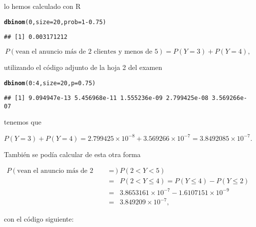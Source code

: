 \documentclass[12pt]{article}\usepackage[]{graphicx}\usepackage[]{color}
\makeatletter
\newcommand{\hlnum}[1]{\textcolor[rgb]{0.686,0.059,0.569}{#1}}%
\newcommand{\hlopt}[1]{\textcolor[rgb]{0,0,0}{#1}}%
\newcommand{\hlstd}[1]{\textcolor[rgb]{0.345,0.345,0.345}{#1}}%
\newcommand{\hlkwc}[1]{\textcolor[rgb]{0.333,0.667,0.333}{#1}}%
\newcommand{\hlkwd}[1]{\textcolor[rgb]{0.737,0.353,0.396}{\textbf{#1}}}%
\newenvironment{kframe}{%
 \def\at@end@of@kframe{}%
 \ifinner\ifhmode%
  \def\at@end@of@kframe{\end{minipage}}%
  \begin{minipage}{\columnwidth}%
 \fi\fi%
 \def\FrameCommand##1{\hskip\@totalleftmargin \hskip-\fboxsep
 \colorbox{shadecolor}{##1}\hskip-\fboxsep
     \hskip-\linewidth \hskip-\@totalleftmargin \hskip\columnwidth}%
 \MakeFramed {\advance\hsize-\width
   \@totalleftmargin\z@ \linewidth\hsize
   \@setminipage}}%
 {\par\unskip\endMakeFramed%
 \at@end@of@kframe}
\newenvironment{knitrout}{}{} %
\renewcommand{\leq}{\leqslant}
\makeatother
\begin{document}
lo hemos calculado con R

\begin{knitrout}
\color{fgcolor}\begin{kframe}
\begin{alltt}
\hlkwd{dbinom}\hlstd{(}\hlnum{0}\hlstd{,}\hlkwc{size}\hlstd{=}\hlnum{20}\hlstd{,}\hlkwc{prob}\hlstd{=}\hlnum{1}\hlopt{-}\hlnum{0.75}\hlstd{)}
\end{alltt}
\begin{verbatim}
## [1] 0.003171212
\end{verbatim}
\end{kframe}
\end{knitrout}

$$P(\mbox{vean el anuncio  más de 2 clientes  y menos de 5})=P(Y=3)+P(Y=4),$$

utilizando el código adjunto de la hoja 2 del examen
\begin{knitrout}
\color{fgcolor}\begin{kframe}
\begin{alltt}
\hlkwd{dbinom}\hlstd{(}\hlnum{0}\hlopt{:}\hlnum{4}\hlstd{,}\hlkwc{size}\hlstd{=}\hlnum{20}\hlstd{,}\hlkwc{p}\hlstd{=}\hlnum{0.75}\hlstd{)}
\end{alltt}
\begin{verbatim}
## [1] 9.094947e-13 5.456968e-11 1.555236e-09 2.799425e-08 3.569266e-07
\end{verbatim}
\end{kframe}
\end{knitrout}

tenemos que 


$$
P(Y=3)+P(Y=4)=2.799425\times 10^{-8}+ 3.569266\times 10^{-7}=
\ensuremath{3.8492085\times 10^{-7}}.
$$


También se podía calcular  de esta otra forma

\begin{eqnarray*}
P(\mbox{vean el anuncio más de 2 clientes y menos de 5})&=& P(2<Y<5)
\\ &=&
P(2<Y\leq 4)= P(Y\leq 4)-P(Y\leq 2)\\
&=& \ensuremath{3.8653161\times 10^{-7}}- \ensuremath{1.6107151\times 10^{-9}}
\\ 
&=&
\ensuremath{3.849209\times 10^{-7}},
\end{eqnarray*}

con el código  siguiente:
\end{document}
